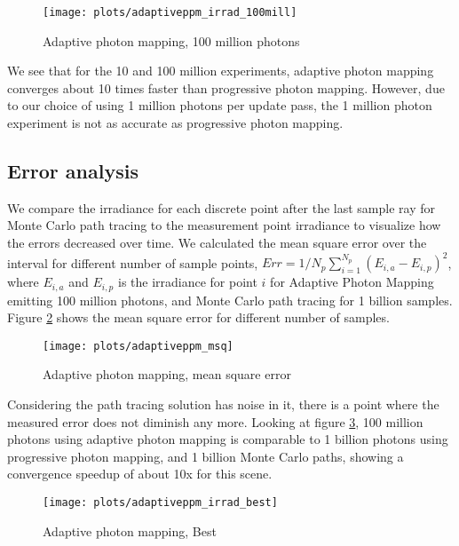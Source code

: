 \begin{figure}
    \centering
    \texttt{[image: plots/adaptiveppm\_irrad\_100mill]}\\
    \caption{Adaptive photon mapping, 100 million photons}
    \label{fig:adaptive_irrad100}
\end{figure}

We see that for the 10 and 100 million experiments, adaptive photon mapping converges about 10 times faster than progressive photon mapping. However, due to our choice of using 1 million photons per update pass, the 1 million photon experiment is not as accurate as progressive photon mapping.

\subsection*{Error analysis}
We compare the irradiance for each discrete point after the last sample ray for Monte Carlo path tracing to the measurement point irradiance to visualize how the errors decreased over time. We calculated the mean square error over the interval for different number of sample points, $Err = 1/N_p \sum_{i=1}^{N_p} (E_{i,a} - E_{i,p})^2$, where $E_{i,a}$ and $E_{i,p}$ is the irradiance for point $i$ for Adaptive Photon Mapping emitting 100 million photons, and Monte Carlo path tracing for 1 billion samples. Figure \ref{fig:adaptive_msq} shows the mean square error for different number of samples.

\begin{figure}[H]
    \centering
    \texttt{[image: plots/adaptiveppm\_msq]}\\
    \caption{Adaptive photon mapping, mean square error}
    \label{fig:adaptive_msq}
\end{figure}

Considering the path tracing solution has noise in it, there is a point where the measured error does not diminish any more. Looking at figure \ref{fig:adaptive_best}, 100 million photons using adaptive photon mapping is comparable to 1 billion photons using progressive photon mapping, and 1 billion Monte Carlo paths, showing a convergence speedup of about 10x for this scene.

\begin{figure}[H]
    \centering
    \texttt{[image: plots/adaptiveppm\_irrad\_best]}\\
    \caption{Adaptive photon mapping, Best}
    \label{fig:adaptive_best}
\end{figure}



